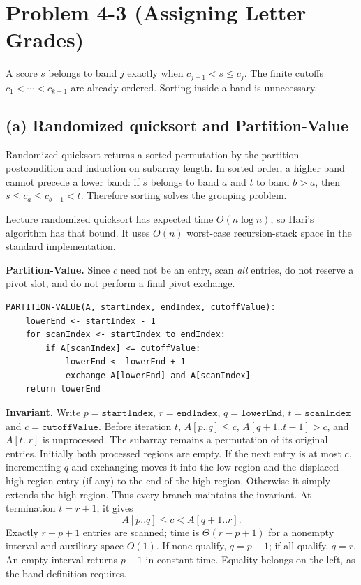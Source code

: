 \documentclass[11pt,a4paper]{article}
\newcommand{\parttitle}[1]{\Needspace{10\baselineskip}\subsection*{#1}}
\begin{document}
\newpage
\section*{Problem 4-3 (Assigning Letter Grades)}
A score $s$ belongs to band $j$ exactly when $c_{j-1}<s\le c_j$. The finite cutoffs $c_1<\cdots<c_{k-1}$ are already ordered. Sorting inside a band is unnecessary.

\parttitle{(a) Randomized quicksort and Partition-Value}
Randomized quicksort returns a sorted permutation by the partition postcondition and induction on subarray length. In sorted order, a higher band cannot precede a lower band: if $s$ belongs to band $a$ and $t$ to band $b>a$, then $s\le c_a\le c_{b-1}<t$. Therefore sorting solves the grouping problem.

Lecture randomized quicksort has expected time $\boxed{O(n\log n)}$, so Hari's algorithm has that bound. It uses $O(n)$ worst-case recursion-stack space in the standard implementation.

\textbf{Partition-Value.} Since $c$ need not be an entry, scan \emph{all} entries, do not reserve a pivot slot, and do not perform a final pivot exchange.
\begin{lstlisting}
PARTITION-VALUE(A, startIndex, endIndex, cutoffValue):
    lowerEnd <- startIndex - 1
    for scanIndex <- startIndex to endIndex:
        if A[scanIndex] <= cutoffValue:
            lowerEnd <- lowerEnd + 1
            exchange A[lowerEnd] and A[scanIndex]
    return lowerEnd
\end{lstlisting}
\textbf{Invariant.} Write $p=\mathtt{startIndex}$, $r=\mathtt{endIndex}$, $q=\mathtt{lowerEnd}$, $t=\mathtt{scanIndex}$ and $c=\mathtt{cutoffValue}$. Before iteration $t$, $A[p..q]\le c$, $A[q+1..t-1]>c$, and $A[t..r]$ is unprocessed. The subarray remains a permutation of its original entries. Initially both processed regions are empty. If the next entry is at most $c$, incrementing $q$ and exchanging moves it into the low region and the displaced high-region entry (if any) to the end of the high region. Otherwise it simply extends the high region. Thus every branch maintains the invariant. At termination $t=r+1$, it gives
\[
\boxed{A[p..q]\le c<A[q+1..r].}
\]
Exactly $r-p+1$ entries are scanned; time is $\Theta(r-p+1)$ for a nonempty interval and auxiliary space $O(1)$. If none qualify, $q=p-1$; if all qualify, $q=r$. An empty interval returns $p-1$ in constant time. Equality belongs on the left, as the band definition requires.
\end{document}
